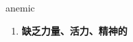 
\begin{frame}
{\huge anemic}
\begin{center}
\begin{enumerate}\Large
  \item \textbf{缺乏力量、活力、精神的}
\end{enumerate}
\end{center}
\end{frame}
